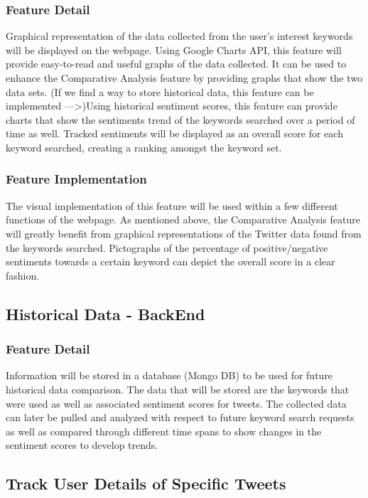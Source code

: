 \documentclass[12pt, titlepage]{article}
\begin{document}
\subsubsection{Feature Detail}
Graphical representation of the data collected from the user’s interest keywords will be displayed on the webpage. Using Google Charts API, this feature will provide easy-to-read and useful graphs of the data collected. It can be used to enhance the Comparative Analysis feature by providing graphs that show the two data sets. (If we find a way to store historical data, this feature can be implemented --->)Using historical sentiment scores, this feature can provide charts that show the sentiments trend of the keywords searched over a period of time as well. Tracked sentiments will be displayed as an overall score for each keyword searched, creating a ranking amongst the keyword set.

\subsubsection{Feature Implementation}
The visual implementation of this feature will be used within a few different functions of the webpage. As mentioned above, the Comparative Analysis feature will greatly benefit from graphical representations of the Twitter data found from the keywords searched. Pictographs of the percentage of positive/negative sentiments towards a certain keyword can depict the overall score in a clear fashion.

\subsection{Historical Data - BackEnd}
\subsubsection{Feature Detail}
Information will be stored in a database (Mongo DB) to be used for future historical data comparison. The data that will be stored are the keywords that were used as well as associated sentiment scores for tweets. The collected data can later be pulled and analyzed with respect to future keyword search requests as well as compared through different time spans to show changes in the sentiment scores to develop trends. 

\subsection{Track User Details of Specific Tweets}
\end{document}
